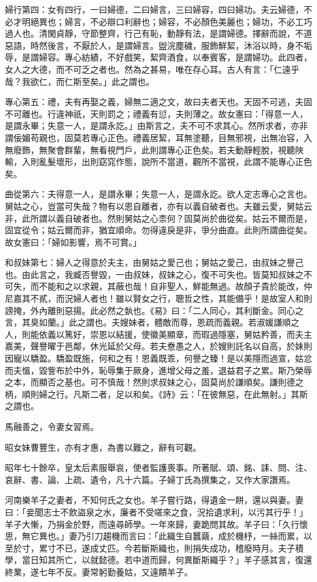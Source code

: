 \begin{pinyinscope}
婦行第四：女有四行，一曰婦德，二曰婦言，三曰婦容，四曰婦功。夫云婦德，不必才明絕異也；婦言，不必辯口利辭也；婦容，不必顏色美麗也；婦功，不必工巧過人也。清閑貞靜，守節整齊，行己有恥，動靜有法，是謂婦德。擇辭而說，不道惡語，時然後言，不厭於人，是謂婦言。盥浣塵穢，服飾鮮絜，沐浴以時，身不垢辱，是謂婦容。專心紡績，不好戲笑，絜齊酒食，以奉賓客，是謂婦功。此四者，女人之大德，而不可乏之者也。然為之甚易，唯在存心耳。古人有言：「仁遠乎哉？我欲仁，而仁斯至矣。」此之謂也。

專心第五：禮，夫有再娶之義，婦無二適之文，故曰夫者天也。天固不可逃，夫固不可離也。行違神祇，天則罰之；禮義有愆，夫則薄之。故女憲曰：「得意一人，是謂永畢；失意一人，是謂永訖。」由斯言之，夫不可不求其心。然所求者，亦非謂佞媚苟親也，固莫若專心正色。禮義居絜，耳無塗聽，目無邪視，出無冶容，入無廢飾，無聚會群輩，無看視門戶，此則謂專心正色矣。若夫動靜輕脫，視聽陜輸，入則亂髮壞形，出則窈窕作態，說所不當道，觀所不當視，此謂不能專心正色矣。

曲從第六：夫得意一人，是謂永畢；失意一人，是謂永訖。欲人定志專心之言也。舅姑之心，豈當可失哉？物有以恩自離者，亦有以義自破者也。夫雖云愛，舅姑云非，此所謂以義自破者也。然則舅姑之心柰何？固莫尚於曲從矣。姑云不爾而是，固宜從令；姑云爾而非，猶宜順命。勿得違戾是非，爭分曲直。此則所謂曲從矣。故女憲曰：「婦如影響，焉不可賞。」

和叔妹第七：婦人之得意於夫主，由舅姑之愛己也；舅姑之愛己，由叔妹之譽己也。由此言之，我臧否譽毀，一由叔妹，叔妹之心，復不可失也。皆莫知叔妹之不可失，而不能和之以求親，其蔽也哉！自非聖人，鮮能無過。故顏子貴於能改，仲尼嘉其不貳，而況婦人者也！雖以賢女之行，聰哲之性，其能備乎！是故室人和則謗掩，外內離則惡揚。此必然之埶也。《易》曰：「二人同心，其利斷金。同心之言，其臭如蘭。」此之謂也。夫嫂妹者，體敵而尊，恩疏而義親。若淑媛謙順之人，則能依義以篤好，崇恩以結援，使徽美顯章，而瑕過隱塞，舅姑矜善，而夫主嘉美，聲譽曜于邑鄰，休光延於父母。若夫憃愚之人，於嫂則託名以自高，於妹則因寵以驕盈。驕盈既施，何和之有！恩義既乖，何譽之臻！是以美隱而過宣，姑忿而夫慍，毀訾布於中外，恥辱集于厥身，進增父母之羞，退益君子之累。斯乃榮辱之本，而顯否之基也。可不慎哉！然則求叔妹之心，固莫尚於謙順矣。謙則德之柄，順則婦之行。凡斯二者，足以和矣。《詩》云：「在彼無惡，在此無射。」其斯之謂也。

馬融善之，令妻女習焉。

昭女妹曹豐生，亦有才惠，為書以難之，辭有可觀。

昭年七十餘卒，皇太后素服舉哀，使者監護喪事。所著賦、頌、銘、誄、問、注、哀辭、書、論、上疏、遺令，凡十六篇。子婦丁氏為撰集之，又作大家讚焉。

河南樂羊子之妻者，不知何氏之女也。羊子嘗行路，得遺金一餅，還以與妻。妻曰：「妾聞志士不飲盜泉之水，廉者不受嗟來之食，況拾遺求利，以污其行乎！」羊子大慚，乃捐金於野，而遠尋師學。一年來歸，妻跪問其故。羊子曰：「久行懷思，無它異也。」妻乃引刀趨機而言曰：「此織生自蠶繭，成於機杼，一絲而累，以至於寸，累寸不已，遂成丈匹。今若斷斯織也，則捐失成功，稽廢時月。夫子積學，當日知其所亡，以就懿德。若中道而歸，何異斷斯織乎？」羊子感其言，復還終業，遂七年不反。妻常躬勤養姑，又遠饋羊子。


\end{pinyinscope}
